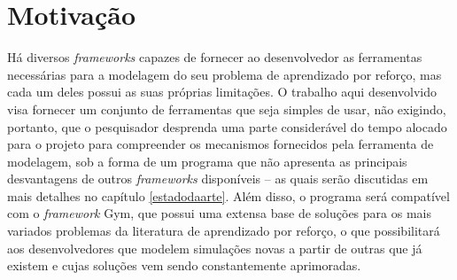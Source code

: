 \documentclass[cic,tc]{iiufrgs}
\newcommand\bruno[1]{\textcolor{magenta}{#1}}
\begin{document}
    
    
    \section{Motivação}
    Há diversos \textit{frameworks} capazes de fornecer ao desenvolvedor as ferramentas necessárias para a modelagem do seu problema de aprendizado por reforço,
    mas cada um deles possui as suas próprias limitações. O trabalho aqui desenvolvido visa fornecer um conjunto de ferramentas que seja simples de usar, não
    exigindo, portanto, que o pesquisador desprenda uma parte considerável do tempo alocado para o projeto para compreender os mecanismos fornecidos pela ferramenta
    de modelagem, sob a forma de um programa que não apresenta as principais desvantagens de outros \textit{frameworks} disponíveis -- as quais serão discutidas
    em mais detalhes no capítulo \ref{estadodaarte}. Além disso, o programa será compatível com o \textit{framework} Gym, que possui uma extensa base de soluções
    para os mais variados problemas da literatura de aprendizado por reforço, o que possibilitará aos desenvolvedores que modelem simulações novas a partir de
    outras que já existem e cujas soluções vem sendo constantemente aprimoradas.
    
\end{document}
